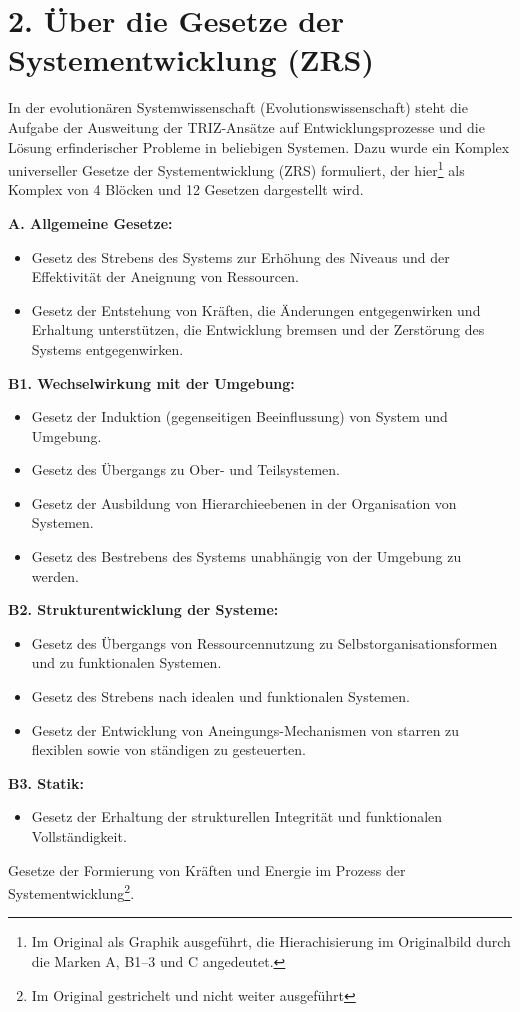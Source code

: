 \documentclass[11pt,a4paper]{article}
\begin{document}
\section*{2. Über die Gesetze der Systementwicklung (ZRS)}
In der evolutionären Systemwissenschaft (Evolutionswissenschaft) steht die
Aufgabe der Ausweitung der TRIZ-Ansätze auf Entwicklungsprozesse und die
Lösung erfinderischer Probleme in beliebigen Systemen. Dazu wurde ein Komplex
universeller Gesetze der Systementwicklung (ZRS) formuliert, der
hier\footnote{Im Original als Graphik ausgeführt, die Hierachisierung im
  Originalbild durch die Marken A, B1--3 und C angedeutet.} als Komplex von 4
Blöcken und 12 Gesetzen dargestellt wird.

\textbf{A. Allgemeine Gesetze:}
\begin{itemize}
\item [1.] Gesetz des Strebens des Systems zur Erhöhung des Niveaus und der
  Effektivität der Aneignung von Ressourcen.
\item [2.] Gesetz der Entstehung von Kräften, die Änderungen entgegenwirken
  und Erhaltung unterstützen, die Entwicklung bremsen und der Zerstörung des
  Systems entgegenwirken.
\end{itemize}
\textbf{B1. Wechselwirkung mit der Umgebung:}
\begin{itemize}
\item [3.] Gesetz der Induktion (gegenseitigen Beeinflussung) von System und
  Umgebung.
\item [4.] Gesetz des Übergangs zu Ober- und Teilsystemen.
\item [5.] Gesetz der Ausbildung von Hierarchieebenen in der Organisation
  von Systemen.
\item [6.] Gesetz des Bestrebens des Systems unabhängig von der Umgebung zu
  werden.
\end{itemize}
\textbf{B2. Strukturentwicklung der Systeme:}
\begin{itemize}
\item [7.] Gesetz des Übergangs von Ressourcennutzung zu
  Selbstorganisationsformen und zu funktionalen Systemen.
\item [8.] Gesetz des Strebens nach idealen und funktionalen Systemen.
\item [9.] Gesetz der Entwicklung von Aneingungs-Mechanismen von starren zu
  flexiblen sowie von ständigen zu gesteuerten.
\end{itemize}
\textbf{B3. Statik:}
\begin{itemize}
\item [10.] Gesetz der Erhaltung der strukturellen Integrität und funktionalen
Vollständigkeit. 
\end{itemize}
Gesetze der Formierung von Kräften und Energie im Prozess der
Systementwicklung\footnote{Im Original gestrichelt und nicht weiter
  ausgeführt}.\medskip
\end{document}
